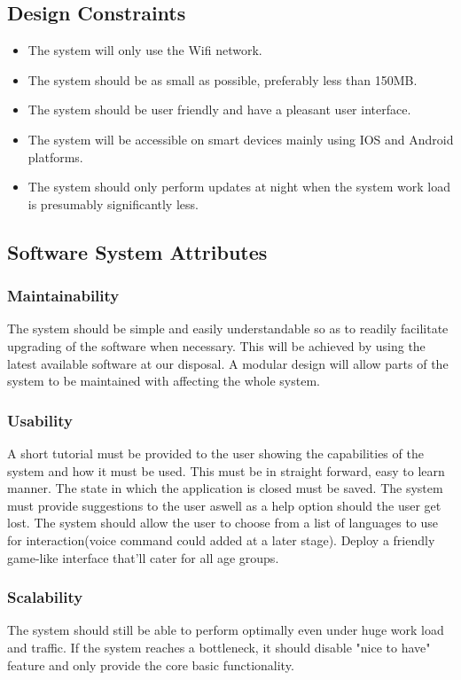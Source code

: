 \documentclass[a4paper,12pt]{report}
\begin{document}
\newpage
\subsection{Design Constraints}
\begin{itemize}
\item The system will only use the Wifi network.
\item The system should be as small as possible, preferably less than 150MB.
\item The system should be user friendly and have a pleasant user interface.
\item The system will be accessible on smart devices mainly using IOS and Android platforms.
\item The system should only perform updates at night when the system work load is presumably significantly less.
\end{itemize}

\newpage
\subsection{Software System Attributes} 
\subsubsection{Maintainability}
The system should be simple and easily understandable so as to readily facilitate upgrading of the software when necessary. This will be achieved by using the latest available software at our disposal. A modular design will allow parts of the system to be maintained with affecting the whole system.
\subsubsection{Usability}
A short tutorial must be provided to the user showing the capabilities of the system and how it must be used. This must be in straight forward, easy to learn manner. The state in which the application is closed must be saved. The system must provide suggestions to the user aswell as a help option should the user get lost. The system should allow the user to choose from a list of languages to use for interaction(voice command could added at a later stage). Deploy a friendly game-like interface that'll cater for all age groups.
\subsubsection{Scalability}
The system should still be able to perform optimally even under huge work load and traffic. If the system reaches a bottleneck, it should disable "nice to have" feature and only provide the core basic functionality. 
\end{document}
